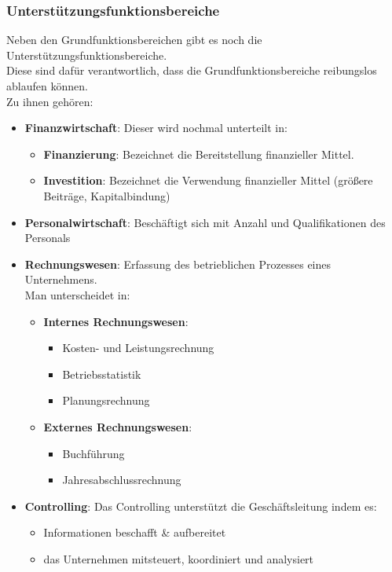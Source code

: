 \documentclass[asp1.tex]{subfiles}
\begin{document}
\subsubsection{Unterstützungsfunktionsbereiche}
Neben den Grundfunktionsbereichen gibt es noch die Unterstützungsfunktionsbereiche. \\
Diese sind dafür verantwortlich, dass die Grundfunktionsbereiche reibungslos ablaufen können. \\
Zu ihnen gehören:
\begin{itemize}
    \item \textbf{Finanzwirtschaft}: Dieser wird nochmal unterteilt in:
          \begin{itemize}
              \item \textbf{Finanzierung}: Bezeichnet die Bereitstellung finanzieller  Mittel.
              \item \textbf{Investition}: Bezeichnet die Verwendung finanzieller Mittel (größere  Beiträge, Kapitalbindung)
          \end{itemize}
    \item \textbf{Personalwirtschaft}: Beschäftigt sich mit Anzahl und Qualifikationen des Personals
    \item \textbf{Rechnungswesen}: Erfassung des  betrieblichen Prozesses eines Unternehmens. \\
          Man unterscheidet in:
          \begin{itemize}
              \item \textbf{Internes Rechnungswesen}:
                    \begin{itemize}
                        \item Kosten- und Leistungsrechnung
                        \item Betriebsstatistik
                        \item Planungsrechnung
                    \end{itemize}
              \item \textbf{Externes Rechnungswesen}:
                    \begin{itemize}
                        \item Buchführung
                        \item Jahresabschlussrechnung
                    \end{itemize}
          \end{itemize}
    \item \textbf{Controlling}: Das Controlling unterstützt die Geschäftsleitung indem es:
          \begin{itemize}
              \item Informationen beschafft \& aufbereitet
              \item das Unternehmen mitsteuert, koordiniert und analysiert
          \end{itemize}
\end{itemize}
\end{document}
